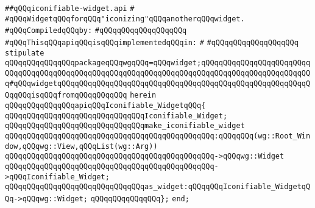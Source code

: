 \label{src/lib/x-kit/widget/old/wrapper/iconifiable-widget.api}
\verb|##qQQqiconifiable-widget.api|\newline
\verb|#|\newline
\verb|#qQQqWidgetqQQqforqQQq"iconizing"qQQqanotherqQQqwidget.|\newline
\newline
\verb|#qQQqCompiledqQQqby:|\newline
\verb|#qQQqqQQqqQQqqQQqqQQq|\newline
\newline
\verb|#qQQqThisqQQqapiqQQqisqQQqimplementedqQQqin:|\newline
\verb|#|\newline
\verb|#qQQqqQQqqQQqqQQqqQQq|\newline
\newline
\verb|stipulate|\newline
\verb|qQQqqQQqqQQqqQQqpackageqQQqwgqQQq=qQQqwidget;qQQqqQQqqQQqqQQqqQQqqQQqqQQqqQQqqQQqqQQqqQQqqQQqqQQqqQQqqQQqqQQqqQQqqQQqqQQqqQQqqQQqqQQqqQQqqQQq#qQQqwidgetqQQqqQQqqQQqqQQqqQQqqQQqqQQqqQQqqQQqqQQqqQQqqQQqqQQqqQQqqQQqqQQqisqQQqfromqQQqqQQqqQQq|\newline
\verb|herein|\newline
\newline
\verb|qQQqqQQqqQQqqQQqapiqQQqIconifiable_WidgetqQQq{|\newline
\newline
\verb|qQQqqQQqqQQqqQQqqQQqqQQqqQQqqQQqIconifiable_Widget;|\newline
\newline
\verb|qQQqqQQqqQQqqQQqqQQqqQQqqQQqqQQqmake_iconifiable_widget|\newline
\verb|qQQqqQQqqQQqqQQqqQQqqQQqqQQqqQQqqQQqqQQqqQQqqQQq:qQQqqQQq(wg::Root_Window,qQQqwg::View,qQQqList(wg::Arg))|\newline
\verb|qQQqqQQqqQQqqQQqqQQqqQQqqQQqqQQqqQQqqQQqqQQqqQQq->qQQqwg::Widget|\newline
\verb|qQQqqQQqqQQqqQQqqQQqqQQqqQQqqQQqqQQqqQQqqQQqqQQq->qQQqIconifiable_Widget;|\newline
\newline
\verb|qQQqqQQqqQQqqQQqqQQqqQQqqQQqqQQqas_widget:qQQqqQQqIconifiable_WidgetqQQq->qQQqwg::Widget;|\newline
\verb|qQQqqQQqqQQqqQQq};|\newline
\newline
\verb|end;|\newline
\newline


